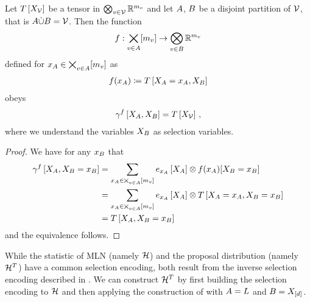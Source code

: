 \begin{theorem}
    \label{the:inverseSelectionEncoding} %
    Let $T\left[X_{\mathcal{V}}\right]$ be a tensor in $\bigotimes_{v\in\mathcal{V}}\mathbb{R}^{m_{v}}$ and let $A$, $B$ be a disjoint partition of $\mathcal{V}$, that is $A\dot{\cup}B=\mathcal{V}$.
    Then the function
    \begin{align*}
        f : \bigtimes_{v\in A}[m_{v}] \rightarrow \bigotimes_{v\in B} \mathbb{R}^{m_{v}}
    \end{align*}
    defined for $x_{A}\in\bigtimes_{v\in A}[m_{v}]$ as
    \begin{align*}
        f(x_{A}) \coloneqq T\left[X_{A}=x_{A},X_{B}\right]
    \end{align*}
    obeys
    \begin{align*}
        \gamma^{f}\left[X_{A},X_{B}\right] = T\left[X_{\mathcal{V}}\right] \, ,
    \end{align*}
    where we understand the variables $X_{B}$ as selection variables.
\end{theorem}
\begin{proof}
    We have for any $x_{B}$ that
    \begin{align*}
        \gamma^{f}\left[X_{A},X_{B}=x_{B}\right]
        &= \sum_{x_{A}\in\bigtimes_{v\in A}[m_{v}]} e_{x_{A}}\left[X_{A}\right]
        \otimes f(x_{A})[X_{B}=x_{B}] \\
        &= \sum_{x_{A}\in\bigtimes_{v\in A}[m_{v}]} e_{x_{A}}\left[X_{A}\right]
        \otimes T\left[X_{A}=x_{A},X_{B}=x_{B}\right] \\
        &= T\left[X_{A},X_{B}=x_{B}\right]
    \end{align*}
    and the equivalence follows.
\end{proof}


\begin{example}
    While the statistic of MLN (namely $\mathcal{H}$) and the proposal distribution (namely $\mathcal{H}^T$) have a common selection encoding, both result from the inverse selection encoding described in .
    We can construct $\mathcal{H}^T$ by first building the selection encoding to $\mathcal{H}$ and then applying the construction of  with $A=L$ and $B=X_{[d]}$.
\end{example}


